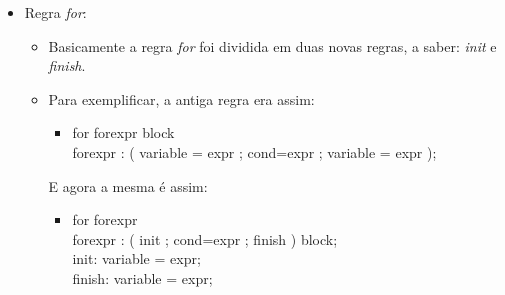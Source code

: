 \begin{itemize}
		\item Regra \textit{for}:
			\begin{itemize}
				\item Basicamente a regra \textit{for} foi dividida em duas novas regras, a saber: \textit{init} e \textit{finish}.
				
				\item Para exemplificar, a antiga regra era assim:\\
				\begin{itemize}
					\item 
					
					\textquotesingle for\textquotesingle \vspace{0.1cm} forexpr block\\
				forexpr : \textquotesingle(\textquotesingle \vspace{0.1cm} variable \textquotesingle =\textquotesingle \vspace{0.1cm} expr \textquotesingle ;\textquotesingle \vspace{0.1cm} cond=expr \textquotesingle ;\textquotesingle \vspace{0.1cm} variable \textquotesingle =\textquotesingle \vspace{0.1cm} expr \textquotesingle)\textquotesingle ;
				\end{itemize}

				
				E agora a mesma é assim:
				\begin{itemize}
					\item 
					
						\textquotesingle for\textquotesingle \vspace{0.1cm} forexpr\\
						forexpr : \textquotesingle(\textquotesingle \vspace{0.1cm} init \textquotesingle ;\textquotesingle \vspace{0.1cm} cond=expr \textquotesingle ;\textquotesingle \vspace{0.1cm} finish \textquotesingle)\textquotesingle \vspace{0.1cm} block;\\
						init: variable \textquotesingle =\textquotesingle \vspace{0.1cm} expr;\\
						finish: variable \textquotesingle =\textquotesingle \vspace{0.1cm} expr;
				\end{itemize}
			\end{itemize}
		

\end{itemize}
